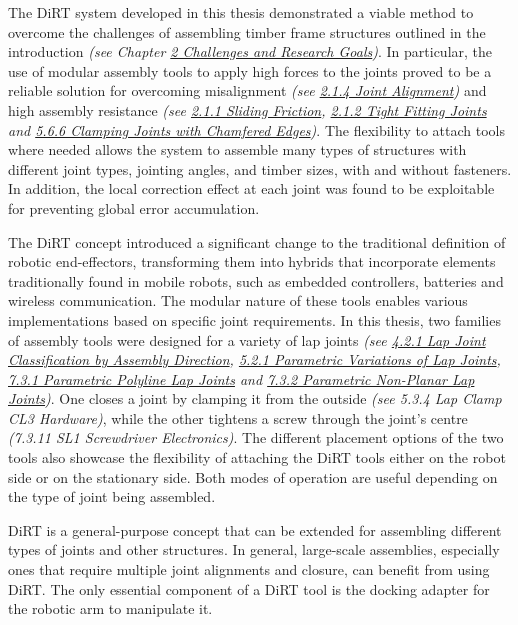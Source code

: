 
The DiRT system developed in this thesis demonstrated a viable method to overcome the challenges of assembling timber frame structures outlined in the introduction \textit{(see Chapter \uline{2 Challenges and Research Goals})}. In particular, the use of modular assembly tools to apply high forces to the joints proved to be a reliable solution for overcoming misalignment \textit{(see \uline{2.1.4 Joint Alignment}) }and high assembly resistance \textit{(see \uline{2.1.1 Sliding Friction}, \uline{2.1.2 Tight Fitting Joints} and \uline{5.6.6 Clamping Joints with Chamfered Edges})}. The flexibility to attach tools where needed allows the system to assemble many types of structures with different joint types, jointing angles, and timber sizes, with and without fasteners. In addition, the local correction effect at each joint was found to be exploitable for preventing global error accumulation.


The DiRT concept introduced a significant change to the traditional definition of robotic end-effectors, transforming them into hybrids that incorporate elements traditionally found in mobile robots, such as embedded controllers, batteries and wireless communication. The modular nature of these tools enables various implementations based on specific joint requirements. In this thesis, two families of assembly tools were designed for a variety of lap joints \textit{(see \uline{4.2.1 Lap Joint Classification by Assembly Direction}, \uline{5.2.1 Parametric Variations of Lap Joints}, \uline{7.3.1 Parametric Polyline Lap Joints} and \uline{7.3.2 Parametric Non-Planar Lap Joints})}. One closes a joint by clamping it from the outside \textit{(see 5.3.4 Lap Clamp CL3 Hardware)}, while the other tightens a screw through the joint's centre \textit{(7.3.11 SL1 Screwdriver Electronics)}. The different placement options of the two tools also showcase the flexibility of attaching the DiRT tools either on the robot side or on the stationary side. Both modes of operation are useful depending on the type of joint being assembled.


DiRT is a general-purpose concept that can be extended for assembling different types of joints and other structures. In general, large-scale assemblies, especially ones that require multiple joint alignments and closure, can benefit from using DiRT. The only essential component of a DiRT tool is the docking adapter for the robotic arm to manipulate it. 

